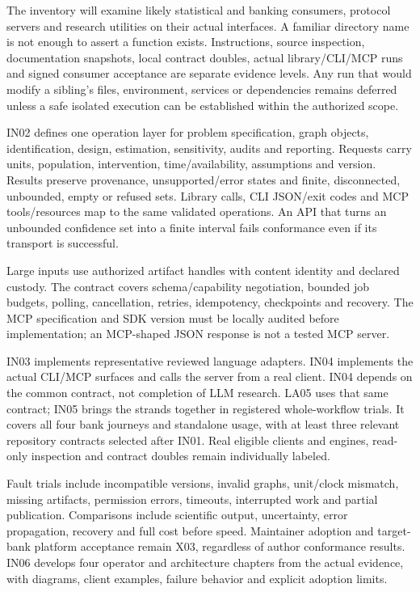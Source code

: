 \documentclass[
  11pt,
  a4paper,
]{article}
\begin{document}
The inventory will examine likely statistical and banking consumers,
protocol servers and research utilities on their actual interfaces. A
familiar directory name is not enough to assert a function exists.
Instructions, source inspection, documentation snapshots, local contract
doubles, actual library/CLI/MCP runs and signed consumer acceptance are
separate evidence levels. Any run that would modify a sibling's files,
environment, services or dependencies remains deferred unless a safe
isolated execution can be established within the authorized scope.

IN02 defines one operation layer for problem specification, graph
objects, identification, design, estimation, sensitivity, audits and
reporting. Requests carry units, population, intervention,
time/availability, assumptions and version. Results preserve provenance,
unsupported/error states and finite, disconnected, unbounded, empty or
refused sets. Library calls, CLI JSON/exit codes and MCP tools/resources
map to the same validated operations. An API that turns an unbounded
confidence set into a finite interval fails conformance even if its
transport is successful.

Large inputs use authorized artifact handles with content identity and
declared custody. The contract covers schema/capability negotiation,
bounded job budgets, polling, cancellation, retries, idempotency,
checkpoints and recovery. The MCP specification and SDK version must be
locally audited before implementation; an MCP-shaped JSON response is
not a tested MCP server.

IN03 implements representative reviewed language adapters. IN04
implements the actual CLI/MCP surfaces and calls the server from a real
client. IN04 depends on the common contract, not completion of LLM
research. LA05 uses that same contract; IN05 brings the strands together
in registered whole-workflow trials. It covers all four bank journeys
and standalone usage, with at least three relevant repository contracts
selected after IN01. Real eligible clients and engines, read-only
inspection and contract doubles remain individually labeled.

Fault trials include incompatible versions, invalid graphs, unit/clock
mismatch, missing artifacts, permission errors, timeouts, interrupted
work and partial publication. Comparisons include scientific output,
uncertainty, error propagation, recovery and full cost before speed.
Maintainer adoption and target-bank platform acceptance remain X03,
regardless of author conformance results. IN06 develops four operator
and architecture chapters from the actual evidence, with diagrams,
client examples, failure behavior and explicit adoption limits.
\end{document}
